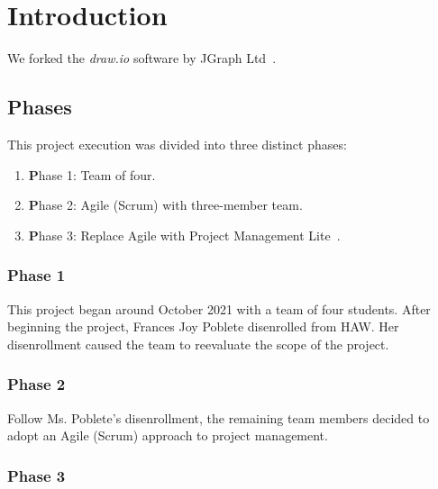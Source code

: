 %
\chapter{Introduction}\label{ch:introduction}
We forked the \emph{draw.io} software by JGraph Ltd~\cite{drawioCode}.

\section{Phases}\label{sec:phases}
This project execution was divided into three distinct phases:
\begin{enumerate}
 \item {\textbf Phase 1}: Team of four.
 \item {\textbf Phase 2}: Agile (Scrum) with three-member team.
 \item {\textbf Phase 3}: Replace Agile with Project Management Lite~\cite{pmlite}.
\end{enumerate}

\subsection{Phase 1}\label{subsec:phase-1}
This project began around October 2021 with a team of four students.
After beginning the project, Frances Joy Poblete disenrolled from HAW.
Her disenrollment caused the team to reevaluate the scope of the project.

\subsection{Phase 2}\label{subsec:phase-2}
Follow Ms. Poblete's disenrollment, the remaining team members decided to adopt an Agile (Scrum) approach to project management.

\subsection{Phase 3}\label{subsec:phase-3}
